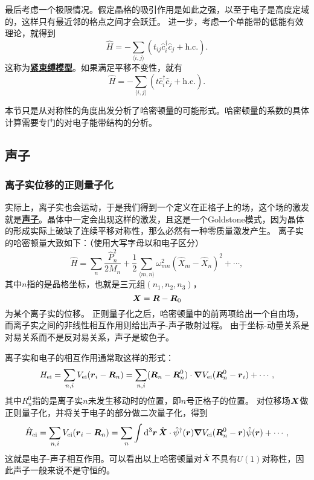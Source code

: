 \documentclass[hyperref, UTF8, a4paper]{ctexart}
\newcommand*{\pair}[1]{\langle #1 \rangle}
\newcommand*{\concept}[1]{\underline{\textbf{#1}}}
\begin{document}
最后考虑一个极限情况。假定晶格的吸引作用是如此之强，以至于电子是高度定域的，这样只有最近邻的格点之间才会跃迁。
进一步，考虑一个单能带的低能有效理论，就得到
\begin{equation}
    \hat{H} = - \sum_{\pair{i, j}} (t_{ij} \hat{c}^\dagger_i \hat{c}_j + \text{h.c.}).
\end{equation}
这称为\concept{紧束缚模型}。如果满足平移不变性，就有
\begin{equation}
    \hat{H} = - \sum_{\pair{i, j}} (t \hat{c}^\dagger_i \hat{c}_j + \text{h.c.}).
\end{equation}

本节只是从对称性的角度出发分析了哈密顿量的可能形式。哈密顿量的系数的具体计算需要专门的对电子能带结构的分析。

\subsection{声子}

\subsubsection{离子实位移的正则量子化}

实际上，离子实也会运动，于是我们得到一个定义在正格子上的场，这个场的激发就是\concept{声子}。晶体中一定会出现这样的激发，且这是一个Goldstone模式，因为晶体的形成实际上破缺了连续平移对称性，那么必然有一种零质量激发产生。
离子实的哈密顿量大致如下：（使用大写字母以和电子区分）
\begin{equation}
    \hat{H} = \sum_n \frac{\hat{P}_n^2}{2M_n} + \frac{1}{2} \sum_{\pair{m, n}} \omega_{mn}^2 (\hat{X}_{m} - \hat{X}_{n})^2 + \cdots, 
\end{equation}
其中$n$指的是晶格坐标，也就是三元组$(n_1, n_2, n_3)$，
\[
    \vb*{X} = \vb*{R} - \vb*{R}_0
\]
为某个离子实的位移。
正则量子化之后，哈密顿量中的前两项给出一个自由场，而离子实之间的非线性相互作用则给出声子-声子散射过程。
由于坐标-动量关系是对易关系而不是反对易关系，声子是玻色子。

离子实和电子的相互作用通常取这样的形式：
\[
    H_\text{ei} = \sum_{n, i} V_\text{ei}(\vb*{r}_i - \vb*{R}_n) = \sum_{n, i} (\vb*{R}_n - \vb*{R}_{n}^0) \cdot \grad{V_\text{ei}}(\vb*{R}_n^0 - \vb*{r}_i) + \cdots,
\]
其中$R^0_n$指的是离子实$n$未发生移动时的位置，即$n$号正格子的位置。
对位移场$\vb*{X}$做正则量子化，并将关于电子的部分做二次量子化，得到
\[
    \hat{H}_{\text{ei}} = \sum_{n, i} V_\text{ei}(\vb*{r}_i - \vb*{R}_n) = \sum_{n} \int \dd[3]{\vb*{r}} \hat{\vb*{X}} \cdot \hat{\psi}^\dagger(\vb*{r}) \grad{V_\text{ei}}(\vb*{R}_n^0 - \vb*{r}) \hat{\psi}(\vb*{r}) + \cdots,
\]
这就是电子-声子相互作用。可以看出以上哈密顿量对$\hat{\vb*{X}}$不具有$U(1)$对称性，因此声子一般来说不是守恒的。
\end{document}
